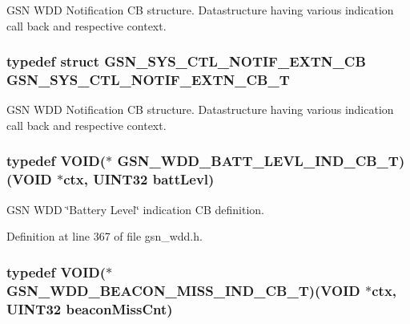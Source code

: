 GSN WDD Notification CB structure. Datastructure having various indication call back and respective context. 

\hypertarget{a00677_ga3fdb6c5df43ccafac3c0d58243f572b0}{
\subsubsection[{GSN\_\-SYS\_\-CTL\_\-NOTIF\_\-EXTN\_\-CB\_\-T}]{\setlength{\rightskip}{0pt plus 5cm}typedef struct {\bf GSN\_\-SYS\_\-CTL\_\-NOTIF\_\-EXTN\_\-CB} {\bf GSN\_\-SYS\_\-CTL\_\-NOTIF\_\-EXTN\_\-CB\_\-T}}}
\label{a00677_ga3fdb6c5df43ccafac3c0d58243f572b0}


GSN WDD Notification CB structure. Datastructure having various indication call back and respective context. 

\hypertarget{a00677_gae1fd7b71fd69db9cad751f084daf2199}{
\subsubsection[{GSN\_\-WDD\_\-BATT\_\-LEVL\_\-IND\_\-CB\_\-T}]{\setlength{\rightskip}{0pt plus 5cm}typedef VOID($\ast$ {\bf GSN\_\-WDD\_\-BATT\_\-LEVL\_\-IND\_\-CB\_\-T})(VOID $\ast$ctx, {\bf UINT32} battLevl)}}
\label{a00677_gae1fd7b71fd69db9cad751f084daf2199}


GSN WDD \char`\"{}Battery Level\char`\"{} indication CB definition. 



Definition at line 367 of file gsn\_\-wdd.h.

\hypertarget{a00677_ga6b4e6d07b52788c8ddf01ddaa89429ad}{
\subsubsection[{GSN\_\-WDD\_\-BEACON\_\-MISS\_\-IND\_\-CB\_\-T}]{\setlength{\rightskip}{0pt plus 5cm}typedef VOID($\ast$ {\bf GSN\_\-WDD\_\-BEACON\_\-MISS\_\-IND\_\-CB\_\-T})(VOID $\ast$ctx, {\bf UINT32} beaconMissCnt)}}
\label{a00677_ga6b4e6d07b52788c8ddf01ddaa89429ad}


